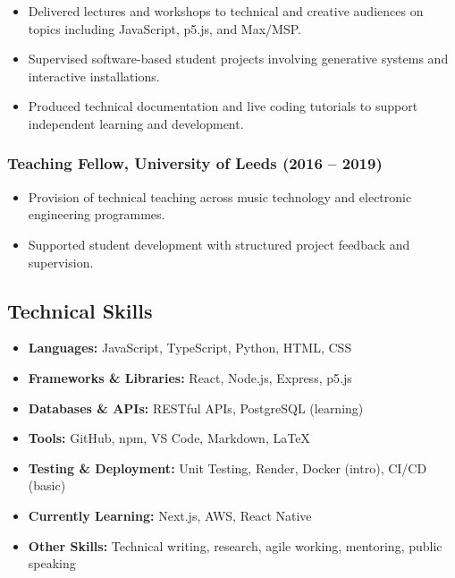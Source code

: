 \documentclass[10pt,a4paper]{article}
\providecommand{\tightlist}{%
  \setlength{\itemsep}{0pt}\setlength{\parskip}{0pt}}
\begin{document}
\begin{itemize}
\tightlist
\item
  Delivered lectures and workshops to technical and creative audiences
  on topics including JavaScript, p5.js, and Max/MSP.
\item
  Supervised software-based student projects involving generative
  systems and interactive installations.
\item
  Produced technical documentation and live coding tutorials to support
  independent learning and development.
\end{itemize}

\subsubsection{Teaching Fellow, University of Leeds (2016 --
2019)}\label{teaching-fellow-university-of-leeds-2016-2019}

\begin{itemize}
\tightlist
\item
  Provision of technical teaching across music technology and electronic
  engineering programmes.
\item
  Supported student development with structured project feedback and
  supervision.
\end{itemize}

\subsection{Technical Skills}\label{technical-skills}

\begin{itemize}
\tightlist
\item
  \textbf{Languages:} JavaScript, TypeScript, Python, HTML, CSS
\item
  \textbf{Frameworks \& Libraries:} React, Node.js, Express, p5.js
\item
  \textbf{Databases \& APIs:} RESTful APIs, PostgreSQL (learning)
\item
  \textbf{Tools:} GitHub, npm, VS Code, Markdown, LaTeX
\item
  \textbf{Testing \& Deployment:} Unit Testing, Render, Docker (intro),
  CI/CD (basic)
\item
  \textbf{Currently Learning:} Next.js, AWS, React Native
\item
  \textbf{Other Skills:} Technical writing, research, agile working,
  mentoring, public speaking
\end{itemize}
\end{document}
